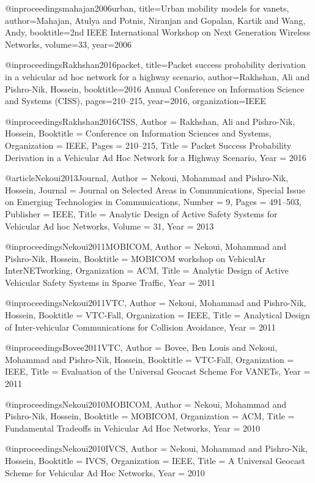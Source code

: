 {{{{@inproceedings{mahajan2006urban,
	title={Urban mobility models for vanets},
	author={Mahajan, Atulya and Potnis, Niranjan and Gopalan, Kartik and Wang, Andy},
	booktitle={2nd IEEE International Workshop on Next Generation Wireless Networks},
	volume={33},
	year={2006}
}

@inproceedings{Rakhshan2016packet,
	title={Packet success probability derivation in a vehicular ad hoc network for a highway scenario},
	author={Rakhshan, Ali and Pishro-Nik, Hossein},
	booktitle={2016 Annual Conference on Information Science and Systems (CISS)},
	pages={210--215},
	year={2016},
	organization={IEEE}
}

@inproceedings{Rakhshan2016CISS,
	Author = {Rakhshan, Ali and Pishro-Nik, Hossein},
	Booktitle = {Conference on Information Sciences and Systems},
	Organization = {IEEE},
	Pages = {210--215},
	Title = {Packet Success Probability Derivation in a Vehicular Ad Hoc Network for a Highway Scenario},
	Year = {2016}}

@article{Nekoui2013Journal,
	Author = {Nekoui, Mohammad and Pishro-Nik, Hossein},
	Journal = {Journal on Selected Areas in Communications, Special Issue on Emerging Technologies in Communications},
	Number = {9},
	Pages = {491--503},
	Publisher = {IEEE},
	Title = {Analytic Design of Active Safety Systems for Vehicular Ad hoc Networks},
	Volume = {31},
	Year = {2013}}


@inproceedings{Nekoui2011MOBICOM,
	Author = {Nekoui, Mohammad and Pishro-Nik, Hossein},
	Booktitle = {MOBICOM workshop on VehiculAr InterNETworking},
	Organization = {ACM},
	Title = {Analytic Design of Active Vehicular Safety Systems in Sparse Traffic},
	Year = {2011}}

@inproceedings{Nekoui2011VTC,
	Author = {Nekoui, Mohammad and Pishro-Nik, Hossein},
	Booktitle = {VTC-Fall},
	Organization = {IEEE},
	Title = {Analytical Design of Inter-vehicular Communications for Collision Avoidance},
	Year = {2011}}

@inproceedings{Bovee2011VTC,
	Author = {Bovee, Ben Louis and Nekoui, Mohammad and Pishro-Nik, Hossein},
	Booktitle = {VTC-Fall},
	Organization = {IEEE},
	Title = {Evaluation of the Universal Geocast Scheme For VANETs},
	Year = {2011}}

@inproceedings{Nekoui2010MOBICOM,
	Author = {Nekoui, Mohammad and Pishro-Nik, Hossein},
	Booktitle = {MOBICOM},
	Organization = {ACM},
	Title = {Fundamental Tradeoffs in Vehicular Ad Hoc Networks},
	Year = {2010}}

@inproceedings{Nekoui2010IVCS,
	Author = {Nekoui, Mohammad and Pishro-Nik, Hossein},
	Booktitle = {IVCS},
	Organization = {IEEE},
	Title = {A Universal Geocast Scheme for Vehicular Ad Hoc Networks},
	Year = {2010}}

}}}}
